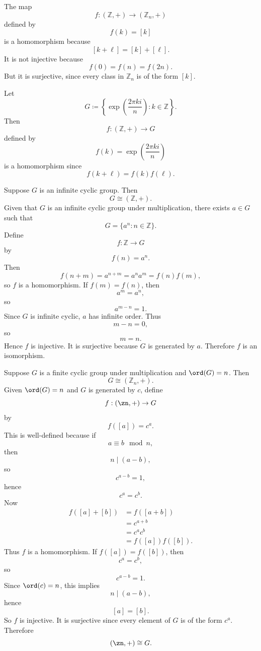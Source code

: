 \begin{example}
    The map
    \[
        f:(\mathbb{Z},+)\to (\mathbb{Z}_n,+)
    \]
    defined by
    \[
        f(k)=[k]
    \]
    is a homomorphism because
    \[
        [k+\ell]=[k]+[\ell].
    \]
    It is not injective because
    \[
        f(0)=f(n)=f(2n).
    \]
    But it is surjective, since every class in $\mathbb{Z}_n$ is of the form $[k]$.
\end{example}

\begin{example}
    Let
    \[
        G\coloneqq \left\{\exp\left(\frac{2\pi ki}{n}\right):k\in\mathbb{Z}\right\}.
    \]
    Then
    \[
        f:(\mathbb{Z},+)\to G
    \]
    defined by
    \[
        f(k)=\exp\left(\frac{2\pi ki}{n}\right)
    \]
    is a homomorphism since
    \[
        f(k+\ell)=f(k)f(\ell).
    \]
\end{example}

\begin{proposition}{
    Suppose $G$ is an infinite cyclic group.
    Then
    \[
        G\cong (\mathbb{Z},+).
    \]
}
    Given that $G$ is an infinite cyclic group under multiplication, there exists $a\in G$ such that
    \[
        G=\{a^n:n\in\mathbb{Z}\}.
    \]
    Define
    \[
        f:\mathbb{Z}\to G
    \]
    by
    \[
        f(n)=a^n.
    \]
    Then
    \[
        f(n+m)=a^{n+m}=a^{n}a^m=f(n)f(m),
    \]
    so $f$ is a homomorphism.
    If $f(m)=f(n)$, then
    \[
        a^m=a^n,
    \]
    so
    \[
        a^{m-n}=1.
    \]
    Since $G$ is infinite cyclic, $a$ has infinite order.
    Thus
    \[
        m-n=0,
    \]
    so
    \[
        m=n.
    \]
    Hence $f$ is injective.
    It is surjective because $G$ is generated by $a$.
    Therefore $f$ is an isomorphism.
\end{proposition}

\begin{proposition}{
    Suppose $G$ is a finite cyclic group under multiplication and $\ord(G)=n$.
    Then
    \[
        G\cong (\mathbb{Z}_n,+).
    \]
}
    Given $\ord(G)=n$ and $G$ is generated by $c$, define
    \[
        f:(\zn,+)\to G
    \]
    by
    \[
        f([a])=c^a.
    \]
    This is well-defined because if
    \[
        a\equiv b\mod n,
    \]
    then
    \[
        n\mid (a-b),
    \]
    so
    \[
        c^{a-b}=1,
    \]
    hence
    \[
        c^a=c^b.
    \]
    Now
    \begin{align*}
        f([a]+[b]) &= f([a+b])\\
        &= c^{a+b}\\
        &= c^{a}c^b\\
        &= f([a])f([b]).
    \end{align*}
    Thus $f$ is a homomorphism.
    If $f([a])=f([b])$, then
    \[
        c^a=c^b,
    \]
    so
    \[
        c^{a-b}=1.
    \]
    Since $\ord(c)=n$, this implies
    \[
        n\mid (a-b),
    \]
    hence
    \[
        [a]=[b].
    \]
    So $f$ is injective.
    It is surjective since every element of $G$ is of the form $c^a$.
    Therefore
    \[
        (\zn,+)\cong G.
    \]
\end{proposition}

